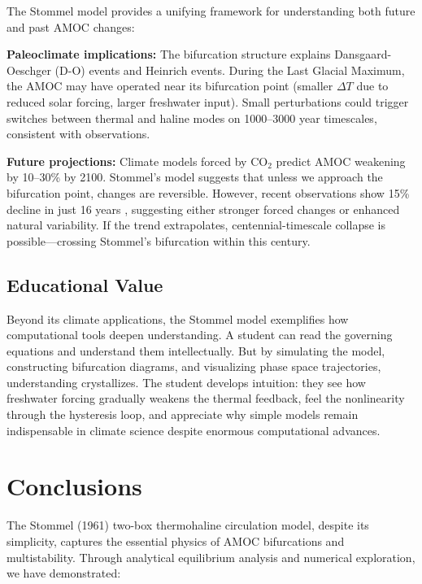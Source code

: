 \documentclass[12pt,letterpaper]{article}
\begin{document}
The Stommel model provides a unifying framework for understanding both future and past AMOC changes:

\noindent \textbf{Paleoclimate implications:} The bifurcation structure explains Dansgaard-Oeschger (D-O) events and Heinrich events. During the Last Glacial Maximum, the AMOC may have operated near its bifurcation point (smaller $\Delta T$ due to reduced solar forcing, larger freshwater input). Small perturbations could trigger switches between thermal and haline modes on 1000--3000 year timescales, consistent with observations.

\noindent \textbf{Future projections:} Climate models forced by CO$_2$ predict AMOC weakening by 10--30\% by 2100. Stommel's model suggests that unless we approach the bifurcation point, changes are reversible. However, recent observations show 15\% decline in just 16 years \citep{Caesar2021, Ditlevsen2023}, suggesting either stronger forced changes or enhanced natural variability. If the trend extrapolates, centennial-timescale collapse is possible---crossing Stommel's bifurcation within this century.

\subsection{Educational Value}

Beyond its climate applications, the Stommel model exemplifies how computational tools deepen understanding. A student can read the governing equations and understand them intellectually. But by simulating the model, constructing bifurcation diagrams, and visualizing phase space trajectories, understanding crystallizes. The student develops intuition: they see how freshwater forcing gradually weakens the thermal feedback, feel the nonlinearity through the hysteresis loop, and appreciate why simple models remain indispensable in climate science despite enormous computational advances.

\section{Conclusions}

The Stommel (1961) two-box thermohaline circulation model, despite its simplicity, captures the essential physics of AMOC bifurcations and multistability. Through analytical equilibrium analysis and numerical exploration, we have demonstrated:
\end{document}
